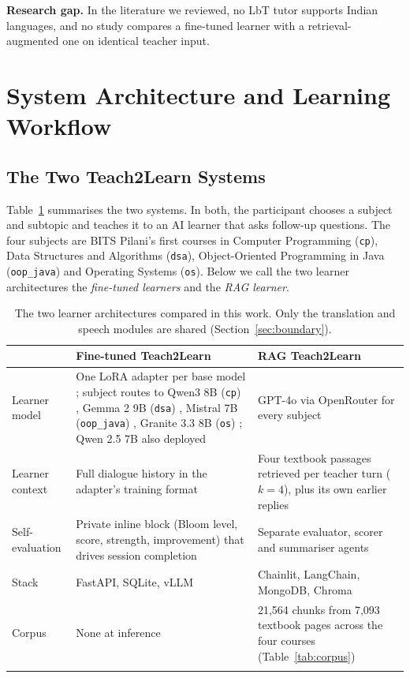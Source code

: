 \documentclass[pdflatex,sn-mathphys-num]{sn-jnl}%
\theoremstyle{thmstyleone}%
\theoremstyle{thmstyletwo}%
\theoremstyle{thmstylethree}%
\begin{document}
\textbf{Research gap.} In the literature we reviewed, no LbT tutor supports Indian languages, and
no study compares a fine-tuned learner with a retrieval-augmented one on identical teacher input.

\section{System Architecture and Learning Workflow}\label{sec:system}

\subsection{The Two Teach2Learn Systems}\label{sec:two-systems}

Table~\ref{tab:systems} summarises the two systems. In both, the participant chooses a subject and
subtopic and teaches it to an AI learner that asks follow-up questions. The four subjects are BITS
Pilani's first courses in Computer Programming (\texttt{cp}), Data Structures and Algorithms
(\texttt{dsa}), Object-Oriented Programming in Java (\texttt{oop\_java}) and Operating Systems
(\texttt{os}). Below we call the two learner architectures the \emph{fine-tuned learners} and the
\emph{RAG learner}.

\begin{table}[t]
\caption{The two learner architectures compared in this work. Only the translation and speech
modules are shared (Section~\ref{sec:boundary}).}\label{tab:systems}
\footnotesize
\begin{tabular*}{\textwidth}{@{\extracolsep\fill}p{}p{}p{}}
\toprule
& Fine-tuned Teach2Learn \cite{finetunedT2L} & RAG Teach2Learn \cite{lahoria2025teach2learn} \\
\midrule
Learner model & One LoRA adapter per base model \cite{hu2022lora}; subject routes to Qwen3 8B (\texttt{cp}) \cite{qwen3}, Gemma 2 9B (\texttt{dsa}) \cite{gemma2}, Mistral 7B (\texttt{oop\_java}) \cite{mistral7b}, Granite 3.3 8B (\texttt{os}) \cite{granite33}; Qwen 2.5 7B \cite{qwen25} also deployed & GPT-4o \cite{gpt4o} via OpenRouter for every subject \\
Learner context & Full dialogue history in the adapter's training format & Four textbook passages retrieved per teacher turn ($k=4$), plus its own earlier replies \\
Self-evaluation & Private inline block (Bloom level, score, strength, improvement) that drives session completion & Separate evaluator, scorer and summariser agents \\
Stack & FastAPI, SQLite, vLLM \cite{kwon2023vllm} & Chainlit, LangChain, MongoDB, Chroma \\
Corpus & None at inference & 21,564 chunks from 7,093 textbook pages across the four courses (Table~\ref{tab:corpus}) \\
\botrule
\end{tabular*}
\end{table}
\end{document}

